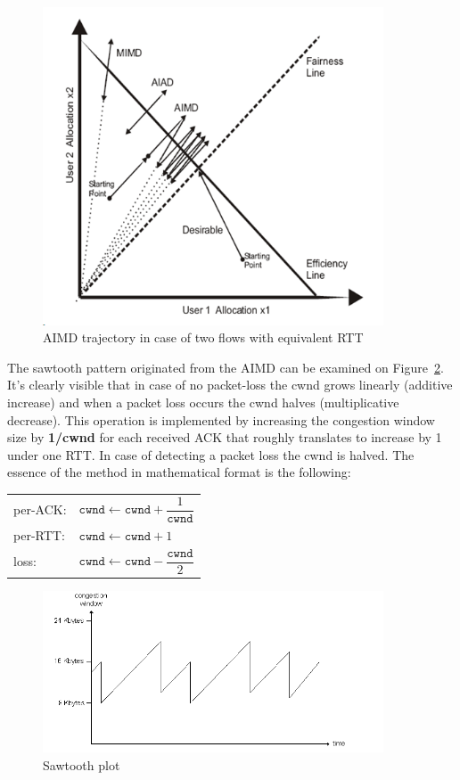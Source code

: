 \documentclass[a4paper]{article}
\begin{document}
\begin{figure}[H]
    \centering
    \includegraphics[width=0.9\textwidth]{figures/AIMD-trajectory.png}
    \caption{AIMD trajectory in case of two flows with equivalent RTT }
    \label{fig:AIMD}
\end{figure}

The sawtooth pattern originated from the AIMD can be examined on Figure~\ref{fig:sawtooth}. It's clearly visible that
in case of no packet-loss the cwnd grows linearly (additive increase) and when a packet loss occurs the cwnd halves
(multiplicative decrease). This operation is implemented by increasing the congestion window size by \textbf{1/cwnd} for each received ACK that
roughly translates to increase by 1 under one RTT. In case of detecting a packet loss the cwnd is halved. The essence
of the method in mathematical format is the following:

\begin{tabular}{ll}
    per-ACK: & $\texttt{cwnd} \leftarrow \texttt{cwnd} + \dfrac{1}{\texttt{cwnd}}$  \\
    per-RTT: & $\texttt{cwnd} \leftarrow \texttt{cwnd} + 1$                         \\
    loss:    & $\texttt{cwnd} \leftarrow \texttt{cwnd} - \dfrac{\texttt{cwnd}}{2}$  \\
\end{tabular}

\begin{figure}[H]
    \centering
    \includegraphics[width=0.9\textwidth]{figures/sawtooth.png}
    \caption{Sawtooth plot}
    \label{fig:sawtooth}
\end{figure}
\end{document}
